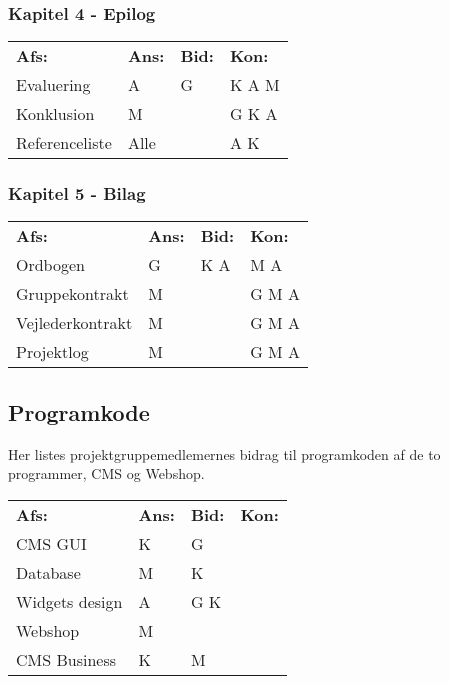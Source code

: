 \subsubsection{Kapitel 4 - Epilog}

  \begin{tabular}{p{3cm}p{1.5cm}p{1.5cm}p{1.5cm}}
    \textbf{Afs:} &\textbf{Ans:} &\textbf{Bid:} &\textbf{Kon:}
    \\ Evaluering 			& A 		& G 	& K A M
    \\ Konklusion 			& M 		& 		& G K A
    \\ Referenceliste 		& Alle 	&		 & A K
    \\
 \end{tabular}

\subsubsection{Kapitel 5 - Bilag}

  \begin{tabular}{p{3cm}p{1.5cm}p{1.5cm}p{1.5cm}}
    \textbf{Afs:} &\textbf{Ans:} &\textbf{Bid:} &\textbf{Kon:}
    \\Ordbogen				& G		& K A & M A
    \\Gruppekontrakt 		& M 	& 	& G M A
    \\Vejlederkontrakt 		& M 	& 	& G M A
    \\Projektlog 			& M 	& 	& G M A
    \\ 
  \end{tabular}

\subsection{Programkode}
Her listes projektgruppemedlemernes bidrag til programkoden af de to programmer, CMS og Webshop.
\newline \hfill
  \begin{tabular}{p{3cm}p{1.5cm}p{1.5cm}p{1.5cm}}
    \textbf{Afs:} &\textbf{Ans:} &\textbf{Bid:} &\textbf{Kon:}
    \\CMS GUI 				& K 	& G 	&
    \\Database 				& M 	& K 	& 
    \\Widgets design 		& A 	& G K 	&
    \\Webshop 				& M 	&  		&
    \\CMS Business 			& K 	& M 	&
    \\ 
  \end{tabular}
\onecolumn